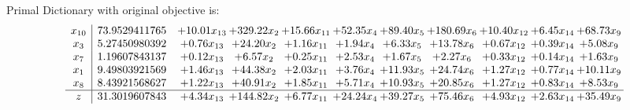 \documentclass[9pt]{article}
\begin{document}
Primal Dictionary with original objective is:
\[\begin{array}{c| c c@{\hskip 2pt} c@{\hskip 2pt} c@{\hskip 2pt} c@{\hskip 2pt} c@{\hskip 2pt} c@{\hskip 2pt} c@{\hskip 2pt} c@{\hskip 2pt} c@{\hskip 2pt} }
 x_{10}   &  73.9529411765 & + 10.01 x_{13} & + 329.22 x_{2} & + 15.66 x_{11} & + 52.35 x_{4} & + 89.40 x_{5} & + 180.69 x_{6} & + 10.40 x_{12} & +  6.45 x_{14} & + 68.73 x_{9}\\
 x_{3}   &  5.27450980392 & +  0.76 x_{13} & + 24.20 x_{2} & +  1.16 x_{11} & +  1.94 x_{4} & +  6.33 x_{5} & + 13.78 x_{6} & +  0.67 x_{12} & +  0.39 x_{14} & +  5.08 x_{9}\\
 x_{7}   &  1.19607843137 & +  0.12 x_{13} & +  6.57 x_{2} & +  0.25 x_{11} & +  2.53 x_{4} & +  1.67 x_{5} & +  2.27 x_{6} & +  0.33 x_{12} & +  0.14 x_{14} & +  1.63 x_{9}\\
 x_{1}   &  9.49803921569 & +  1.46 x_{13} & + 44.38 x_{2} & +  2.03 x_{11} & +  3.76 x_{4} & + 11.93 x_{5} & + 24.74 x_{6} & +  1.27 x_{12} & +  0.77 x_{14} & + 10.11 x_{9}\\
 x_{8}   &  8.43921568627 & +  1.22 x_{13} & + 40.91 x_{2} & +  1.85 x_{11} & +  5.71 x_{4} & + 10.93 x_{5} & + 20.85 x_{6} & +  1.27 x_{12} & +  0.83 x_{14} & +  8.53 x_{9}\\
\hline
z    &  31.3019607843 & +  4.34 x_{13} & + 144.82 x_{2} & +  6.77 x_{11} & + 24.24 x_{4} & + 39.27 x_{5} & + 75.46 x_{6} & +  4.93 x_{12} & +  2.63 x_{14} & + 35.49 x_{9}\\
\end{array}\]
\end{document}
